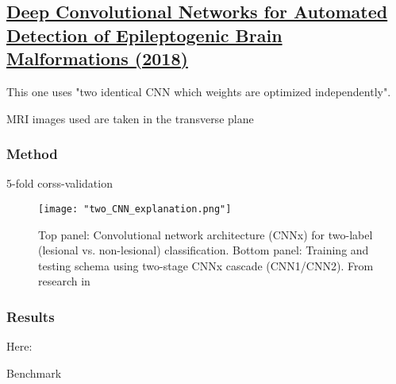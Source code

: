 \subsection{\href{https://link.springer.com/chapter/10.1007/978-3-030-00931-1_56}{Deep Convolutional Networks for Automated Detection of Epileptogenic Brain Malformations (2018)}}
\label{sub:sec:res5}

This one uses "two identical CNN which weights are optimized independently".

MRI images used are taken in the transverse plane

\subsubsection{Method}

5-fold corss-validation

\begin{figure}[htbp]
	\centering
	\texttt{[image: "two\_CNN\_explanation.png"]}
	\caption{Top panel: Convolutional network architecture (CNNx) for two-label (lesional vs. non-lesional) classification. Bottom panel: Training and testing schema using two-stage CNNx cascade (CNN1/CNN2). From research in }
\end{figure}

\subsubsection{Results}

Here: 

\begin{table}[htbp]
	\centering
	\caption{Benchmark}

	\caption{Results from }
	\label{tab:res5}
\end{table}

